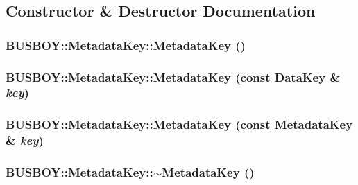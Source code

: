 \subsection{Constructor \& Destructor Documentation}
\hypertarget{classBUSBOY_1_1MetadataKey_a491339dfe8773ab3a9942bae3c516dac}{
\subsubsection[{MetadataKey}]{\setlength{\rightskip}{0pt plus 5cm}BUSBOY::MetadataKey::MetadataKey ()}}
\label{classBUSBOY_1_1MetadataKey_a491339dfe8773ab3a9942bae3c516dac}
\hypertarget{classBUSBOY_1_1MetadataKey_afaf2aa6f3f1a47f7fe43852339cb91f6}{
\subsubsection[{MetadataKey}]{\setlength{\rightskip}{0pt plus 5cm}BUSBOY::MetadataKey::MetadataKey (const {\bf DataKey} \& {\em key})}}
\label{classBUSBOY_1_1MetadataKey_afaf2aa6f3f1a47f7fe43852339cb91f6}
\hypertarget{classBUSBOY_1_1MetadataKey_ad18d178f6c106d20f6ba9dfd8377ebe9}{
\subsubsection[{MetadataKey}]{\setlength{\rightskip}{0pt plus 5cm}BUSBOY::MetadataKey::MetadataKey (const {\bf MetadataKey} \& {\em key})}}
\label{classBUSBOY_1_1MetadataKey_ad18d178f6c106d20f6ba9dfd8377ebe9}
\hypertarget{classBUSBOY_1_1MetadataKey_ab3d96536683deec947ea0bb222aec1f1}{
\subsubsection[{$\sim$MetadataKey}]{\setlength{\rightskip}{0pt plus 5cm}BUSBOY::MetadataKey::$\sim$MetadataKey ()}}
\label{classBUSBOY_1_1MetadataKey_ab3d96536683deec947ea0bb222aec1f1}


